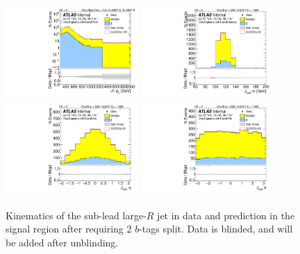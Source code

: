 \begin{figure}[htbp!]
\begin{center}
\includegraphics[angle=270, width=0.45\textwidth]{./figures/boosted/Signal/b77_TwoTag_split_Signal_sublHCand_Pt_m_1_blind.pdf}
\includegraphics[angle=270, width=0.45\textwidth]{./figures/boosted/Signal/b77_TwoTag_split_Signal_sublHCand_Mass_s_blind.pdf}\\
\includegraphics[angle=270, width=0.45\textwidth]{./figures/boosted/Signal/b77_TwoTag_split_Signal_sublHCand_Eta_blind.pdf}
\includegraphics[angle=270, width=0.45\textwidth]{./figures/boosted/Signal/b77_TwoTag_split_Signal_sublHCand_Phi_blind.pdf}
  \caption{Kinematics of the sub-lead large-$R$ jet in data and prediction in the signal region after requiring 2 $b$-tags split. Data is blinded, and will be added after unblinding.}
  \label{fig:boosted-2bs-signal-blind-ak10-subl}
\end{center}
\end{figure}

